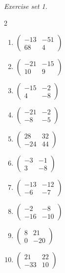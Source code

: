 \par\noindent\emph{Exercise set 1.}\nopagebreak
\begin{multicols}{2}\raggedright
\begin{enumerate}[label=\arabic*., leftmargin=*, itemsep=1pt]
\item $\left(\begin{smallmatrix}-13 & -51\\ 68 & 4\end{smallmatrix}\right)$
\item $\left(\begin{smallmatrix}-21 & -15\\ 10 & 9\end{smallmatrix}\right)$
\item $\left(\begin{smallmatrix}-15 & -2\\ 4 & -8\end{smallmatrix}\right)$
\item $\left(\begin{smallmatrix}-21 & -2\\ -8 & -5\end{smallmatrix}\right)$
\item $\left(\begin{smallmatrix}28 & 32\\ -24 & 44\end{smallmatrix}\right)$
\item $\left(\begin{smallmatrix}-3 & -1\\ 3 & -8\end{smallmatrix}\right)$
\item $\left(\begin{smallmatrix}-13 & -12\\ -6 & -7\end{smallmatrix}\right)$
\item $\left(\begin{smallmatrix}-2 & -8\\ -16 & -10\end{smallmatrix}\right)$
\item $\left(\begin{smallmatrix}8 & 21\\ 0 & -20\end{smallmatrix}\right)$
\item $\left(\begin{smallmatrix}21 & 22\\ -33 & 10\end{smallmatrix}\right)$

\end{enumerate}
\end{multicols}
